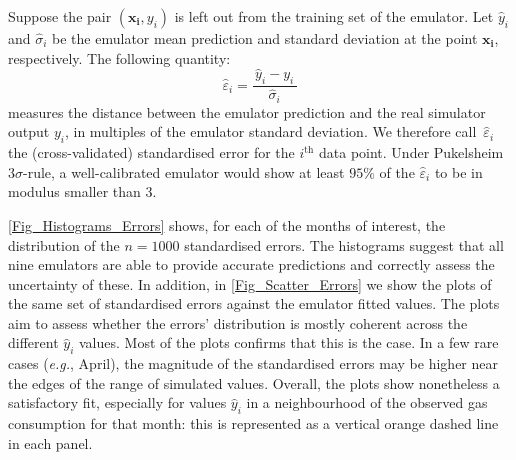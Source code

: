 \documentclass[a4paper, 12pt]{article}
\newcommand{\eg}{\textit{e.g.}}
\newcommand{\bd}[1]{\boldsymbol{#1}}
\newcommand{\eps}{\varepsilon}
\begin{document}
Suppose the pair $(\bd{x_i}, y_i)$ is left out from the training set of the emulator. Let $\widehat y_i$ and $\widehat\sigma_i$ be the emulator mean prediction and standard deviation at the point $\bd{x_i}$, respectively. The following quantity:
\begin{equation}\label{Eqn_St_Err}
 \widehat{\eps}_i = \frac{\, \widehat y_i - y_i \,}{\widehat \sigma_i}
\end{equation}
measures the distance between the emulator prediction and the real simulator output $y_i$, in multiples of the emulator standard deviation. We therefore call $\,\widehat \eps_i$ the (cross-validated) standardised error for the $i^\text{th}$ data point.
Under Pukelsheim $3\sigma$-rule, a well-calibrated emulator would show at least $95\%$ of the $\widehat \eps_i$ to be in modulus smaller than 3. %
\vspace{-1ex}

\autoref{Fig_Histograms_Errors} shows, for each of the months of interest, the distribution of the $n=1000$ standardised errors. The histograms suggest that all nine emulators are able to provide accurate predictions and correctly assess the uncertainty of these.
In addition, in \autoref{Fig_Scatter_Errors} we show the plots of the same set of standardised errors against the emulator fitted values. The plots aim to assess whether the errors' distribution is mostly coherent across the different $\widehat y_i$ values. Most of the plots confirms that this is the case. In a few rare cases (\eg, April), the magnitude of the standardised errors may be higher near the edges of the range of simulated values. Overall, the plots show nonetheless a satisfactory fit, especially for values $\widehat y_i$ in a neighbourhood of the observed gas consumption for that month: this is represented as a vertical orange dashed line in each panel.
\end{document}
